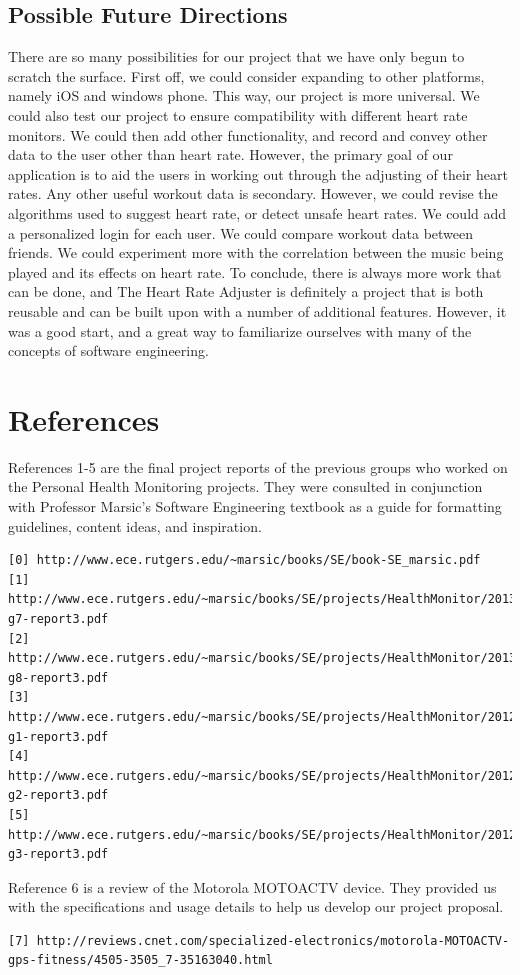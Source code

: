 \documentclass[letterpaper,english, 12pt]{scrreprt}
\begin{document}
\section{Possible Future Directions}
There are so many possibilities for our project that we have only begun to scratch the surface. First off, we could consider expanding to other platforms, namely iOS and windows phone. This way, our project is more universal. We could also test our project to ensure compatibility with different heart rate monitors. We could then add other functionality, and record and convey other data to the user other than heart rate. However, the primary goal of our application is to aid the users in working out through the adjusting of their heart rates. Any other useful workout data is secondary. However, we could revise the algorithms used to suggest heart rate, or detect unsafe heart rates. We could add a personalized login for each user. We could compare workout data between friends. We could experiment more with the correlation between the music being played and its effects on heart rate.
To conclude, there is always more work that can be done, and The Heart Rate Adjuster is definitely a project that is both reusable and can be built upon with a number of additional features. However, it was a good start, and a great way to familiarize ourselves with many of the concepts of software engineering. 


\chapter*{References}

References 1-5 are the final project reports of the previous groups who worked on the Personal Health Monitoring projects. They were consulted in conjunction with Professor Marsic's Software Engineering textbook as a guide for formatting guidelines, content ideas, and inspiration. 
\begin{verbatim}
[0] http://www.ece.rutgers.edu/~marsic/books/SE/book-SE_marsic.pdf
[1] http://www.ece.rutgers.edu/~marsic/books/SE/projects/HealthMonitor/2013-g7-report3.pdf
[2] http://www.ece.rutgers.edu/~marsic/books/SE/projects/HealthMonitor/2013-g8-report3.pdf
[3] http://www.ece.rutgers.edu/~marsic/books/SE/projects/HealthMonitor/2012-g1-report3.pdf
[4] http://www.ece.rutgers.edu/~marsic/books/SE/projects/HealthMonitor/2012-g2-report3.pdf
[5] http://www.ece.rutgers.edu/~marsic/books/SE/projects/HealthMonitor/2012-g3-report3.pdf
\end{verbatim}
Reference 6 is a review of the Motorola MOTOACTV device. They provided us with the specifications and usage details to help us develop our project proposal.
\begin{verbatim}
[7] http://reviews.cnet.com/specialized-electronics/motorola-MOTOACTV-gps-fitness/4505-3505_7-35163040.html
\end{verbatim}
\end{document}
